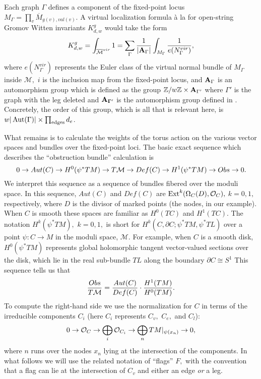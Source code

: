 \documentclass[a4paper,11pt]{article}
\newcommand{\PP}{{\mathbb{P}}}
\newcommand{\Z}{\mathbb{Z}}
\newcommand{\Aut}{\operatorname{Aut}}
\begin{document}
Each graph
$\Gamma$ defines a component of the fixed-point locus
$M_\Gamma = \prod_{v}\overline{M}_{g(v),val(v)}.$
A virtual localization formula
\`a la \cite{GP} for open-string Gromov Witten
invariants $K^g_{d,w}$
would take the form
\begin{equation}
\label{virloc}
K^g_{d,w} = \int_{\overline{\mathcal M}^{vir}} 1
= \sum_{\Gamma}\frac{1}{|{\bf A}_\Gamma |}
\int_{M_{\Gamma}}\frac{1}{e(N_\Gamma^{vir})},
\end{equation}
where $e(N_\Gamma^{vir})$
represents the Euler class of the
virtual normal bundle of $M_\Gamma$ inside ${\mathcal M},$
$i$ is the inclusion map from the fixed-point locus,
and
${\bf A}_{\Gamma}$
is an automorphism group which is defined as
the group $\Z/w\Z \times {\bf A}_{\Gamma '}$ 
where $\Gamma '$ is the graph with the leg deleted
and ${\bf A_{\Gamma '}}$ is the automorphism group
defined in \cite{GP}.  Concretely, the order of
this group, which is all that is relevant here, is
$w|\Aut (\Gamma)| \times \prod_{{\rm edges}} d_e$.

What remains is to calculate the weights of the
torus action on the various vector spaces and bundles
over the fixed-point loci.
The basic exact sequence
which describes the ``obstruction bundle''
calculation is
$$0\rightarrow
Aut(C)\rightarrow H^0(\psi^*TM)\rightarrow T{\cal M}\rightarrow
Def(C)\rightarrow H^1(\psi^*TM)\rightarrow Obs\rightarrow 0.$$
We interpret this sequence as a sequence of bundles
fibered over the moduli space.
In this sequence, $Aut(C)$ and $Def(C)$
are ${\rm Ext}^k(\Omega_C(D),{\cal O}_C),$
$k = 0,1,$ respectively, where $D$ is the
divisor of marked points (the nodes, in our example). 
When $C$ is smooth these spaces are familiar as
$H^0(TC)$ and $H^1(TC).$  The notation $H^k(\psi^*TM),$
$k=0,1,$ is short for $H^k(C,\partial C;\psi^*TM,\psi^*TL)$
over a point $\psi:C\rightarrow M$ in
the moduli space, ${\mathcal M}.$
For example, when $C$ is a smooth disk, $H^0(\psi^*TM)$
represents global holomorphic tangent vector-valued
sections over the disk, which lie in the real
sub-bundle $TL$ along the boundary $\partial C\cong S^1$
This sequence tells us that
\begin{equation}
\label{numden}
\frac{Obs}{T{\cal M}} =
\frac{Aut(C)}{Def(C)}\cdot \frac{H^1(TM)}
{H^0(TM)}.
\end{equation}
To compute the right-hand side we use the normalization
for $C$ in terms of the irreducible components $C_i$
(here $C_i$ represents $C_v,$
$C_e,$ and $C_l$):
\begin{equation}
\label{normseq}0\rightarrow {\cal O}_C\rightarrow
\bigoplus_{i}{\cal O}_{C_i}\rightarrow
\bigoplus_n{TM|_{\psi(x_n)}}
\rightarrow 0,
\end{equation}
where $n$ runs over the nodes $x_n$ lying at the
intersection of the components.  In what follows
we will use
the related notation of ``flags'' $F,$ with the
convention that a flag can lie at the intersection of
$C_v$ and either an edge {\em or} a leg.
\end{document}

